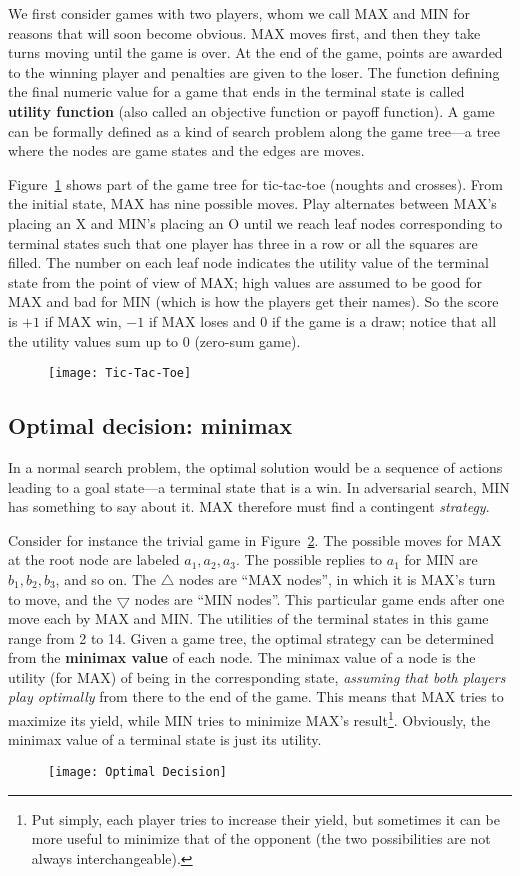 We first consider games with two players, whom we call MAX and MIN for reasons that will soon become obvious. MAX moves first, and then they take turns moving until the game is over. At the end of the game, points are awarded to the winning player and penalties are given to the loser. The function defining the final numeric value for a game that ends in the terminal state is called \textbf{utility function} (also called an objective function or payoff function). A game can be formally defined as a kind of search problem along the game tree—a tree where the nodes are game states and the edges are moves.

Figure~\ref{Tic-Tac-Toe} shows part of the game tree for tic-tac-toe (noughts and crosses). From the initial state, MAX has nine possible moves. Play alternates between MAX's placing an X and MIN's placing an O until we reach leaf nodes corresponding to terminal states such that one player has three in a row or all the squares are filled. The number on each leaf node indicates the utility value of the terminal state from the point of view of MAX; high values are assumed to be good for MAX and bad for MIN (which is how the players get their names). So the score is $+1$ if MAX win, $-1$ if MAX loses and $0$ if the game is a draw; notice that all the utility values sum up to 0 (zero-sum game).
\begin{figure}[h!t]
\centering
\texttt{[image: Tic-Tac-Toe]}
\caption{}\label{Tic-Tac-Toe}
\end{figure}
\subsection{Optimal decision: minimax}
In a normal search problem, the optimal solution would be a sequence of actions leading to a goal state—a terminal state that is a win. In adversarial search, MIN has something to say about it. MAX therefore must find a contingent \emph{strategy}.

Consider for instance the trivial game in Figure~\ref{Optimal_Decision}. The possible moves for MAX at the root node are labeled $a_1, a_2, a_3$. The possible replies to $a_1$ for MIN are $b_1, b_2, b_3$, and so on. The $\bigtriangleup$ nodes are ``MAX nodes'', in which it is MAX's turn to move, and the $\bigtriangledown$ nodes are ``MIN nodes''. This particular game ends after one move each by MAX and MIN. The utilities of the terminal states in this game range from 2 to 14. Given a game tree, the optimal strategy can be determined from the \textbf{minimax value} of each node. The minimax value of a node is the utility (for MAX) of being in the corresponding state, \emph{assuming that both players play optimally} from there to the end of the game. This means that MAX tries to maximize its yield, while MIN tries to minimize MAX's result\footnote{Put simply, each player tries to increase their yield, but sometimes it can be more useful to minimize that of the opponent (the two possibilities are not always interchangeable).}. Obviously, the minimax value of a terminal state is just its utility.
\begin{figure}[h!t]
\centering
\texttt{[image: Optimal Decision]}
\caption{}\label{Optimal_Decision}
\end{figure}

